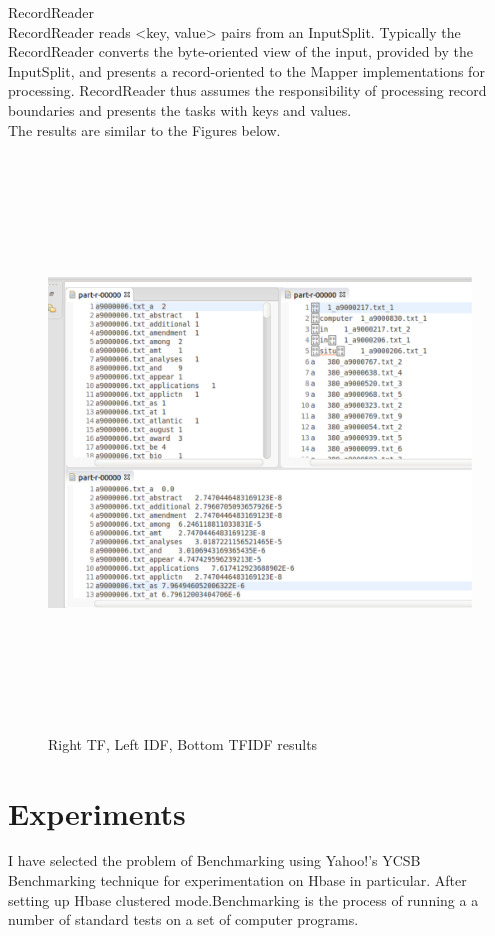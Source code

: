 \documentclass{bigdata}
\begin{document}
RecordReader\\
RecordReader reads <key, value> pairs from an InputSplit.
Typically the RecordReader converts the byte-oriented view of the input, provided by the InputSplit, and presents a record-oriented to the Mapper implementations for processing. RecordReader thus assumes the responsibility of processing record boundaries and presents the tasks with keys and values.\\
The results are similar to the Figures below.
\begin{figure}
\includegraphics[height=6in, width=6in]{image4}
\caption{Right TF, Left IDF, Bottom TFIDF results}
\end{figure}
\section{Experiments}
I have selected the problem of Benchmarking using Yahoo!'s YCSB Benchmarking technique for experimentation on Hbase in particular. After setting up Hbase clustered mode.Benchmarking is the process of running a a number of standard tests on a set of computer programs.\\
\end{document}
